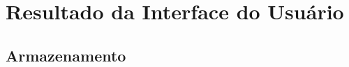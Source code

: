 \chapter {Resultado da Interface do Usuário}
\label{c:resultado_da_interface_do_usuario}

\section{Armazenamento}
\lipsum[25]